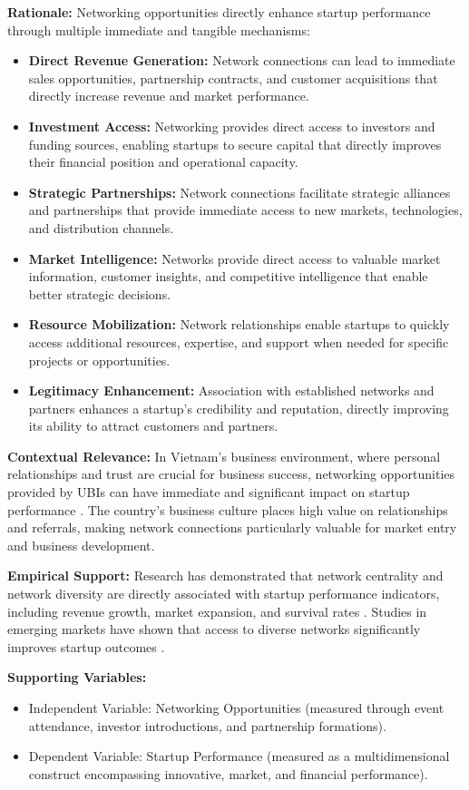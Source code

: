 \documentclass[../Main.tex]{subfiles}
\begin{document}
    \textbf{Rationale:} Networking opportunities directly enhance startup performance through multiple immediate and tangible mechanisms:
    \begin{itemize}
        \item \textbf{Direct Revenue Generation:} Network connections can lead to immediate sales opportunities, partnership contracts, and customer acquisitions that directly increase revenue and market performance.
        \item \textbf{Investment Access:} Networking provides direct access to investors and funding sources, enabling startups to secure capital that directly improves their financial position and operational capacity.
        \item \textbf{Strategic Partnerships:} Network connections facilitate strategic alliances and partnerships that provide immediate access to new markets, technologies, and distribution channels.
        \item \textbf{Market Intelligence:} Networks provide direct access to valuable market information, customer insights, and competitive intelligence that enable better strategic decisions.
        \item \textbf{Resource Mobilization:} Network relationships enable startups to quickly access additional resources, expertise, and support when needed for specific projects or opportunities.
        \item \textbf{Legitimacy Enhancement:} Association with established networks and partners enhances a startup's credibility and reputation, directly improving its ability to attract customers and partners.
    \end{itemize}
    
    \textbf{Contextual Relevance:} In Vietnam's business environment, where personal relationships and trust are crucial for business success, networking opportunities provided by UBIs can have immediate and significant impact on startup performance \cite{spigel2017relational}. The country's business culture places high value on relationships and referrals, making network connections particularly valuable for market entry and business development.
    
    \textbf{Empirical Support:} Research has demonstrated that network centrality and network diversity are directly associated with startup performance indicators, including revenue growth, market expansion, and survival rates \cite{stam2008entrepreneurial}. Studies in emerging markets have shown that access to diverse networks significantly improves startup outcomes \cite{batjargal2003social}.
    
    \textbf{Supporting Variables:}
    \begin{itemize}
        \item Independent Variable: Networking Opportunities (measured through event attendance, investor introductions, and partnership formations).
        \item Dependent Variable: Startup Performance (measured as a multidimensional construct encompassing innovative, market, and financial performance).
    \end{itemize}
\end{document}
